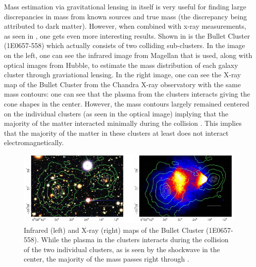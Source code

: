 
Mass estimation via gravitational lensing in itself is very useful for finding large discrepancies in mass from known sources and true mass (the discrepancy being attributed to dark matter).  However, when combined with x-ray measurements, as seen in , one gets even more interesting results.  Shown in  is the Bullet Cluster (1E0657-558) which actually consists of two colliding sub-clusters.  In the image on the left, one can see the infrared image from Magellan that is used, along with optical images from Hubble, to estimate the mass distribution of each galaxy cluster through graviational lensing.  In the right image, one can see the X-ray map of the Bullet Cluster from the Chandra X-ray observatory with the same mass contours: one can see that the plasma from the clusters interacts giving the cone shapes in the center.  However, the mass contours largely remained centered on the individual clusters (as seen in the optical image) implying that the majority of the matter interacted minimally during the collision \cite{clowe2006direct}.  This implies that the majority of the matter in these clusters at least does not interact electromagnetically.


\begin{figure}[t]
	\centering
	\includegraphics[width=0.999\textwidth]{bullet_cluster}
	\caption{Infrared (left) and X-ray (right) maps of the Bullet Cluster (1E0657-558).  While the plasma in the clusters interacts during the collision of the two individual clusters, as is seen by the shockwave in the center, the majority of the mass passes right through \cite{clowe2006direct}.}
	\label{fig:bullet_cluster}
\end{figure}


